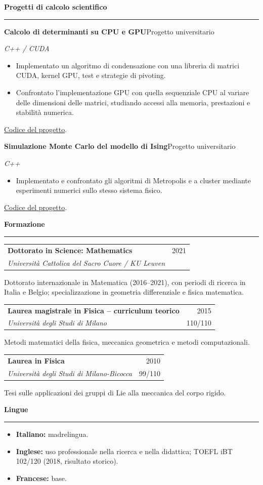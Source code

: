 \documentclass[10pt,a4paper]{article}
\makeatletter
\newcommand{\cvsection}[1]{%
    \Needspace{4\baselineskip}%
    \vspace{0.8em}%
    {\large\bfseries\color{accent} #1}\par
    \vspace{0.2em}\hrule\vspace{0.45em}%
}
\newcommand{\entry}[4]{%
    \Needspace{4\baselineskip}%
    \textbf{#1}\hfill #2\par
    \textit{#3}\par
    #4\par\vspace{0.45em}%
}
\newcommand{\education}[5]{%
    \Needspace{5\baselineskip}%
    \begin{tabularx}{\textwidth}{@{}>{\raggedright\arraybackslash}Xr@{}}
        \textbf{#1} & #2 \\
        \textit{#4} & #3
    \end{tabularx}\par
    #5\par\vspace{0.45em}%
}
\makeatother
\begin{document}
\cvsection{Progetti di calcolo scientifico}
\entry{Calcolo di determinanti su CPU e GPU}{Progetto universitario}{C++ / CUDA}{%
\begin{itemize}
    \item Implementato un algoritmo di condensazione con una libreria di matrici CUDA, kernel GPU, test e strategie di pivoting.
    \item Confrontato l'implementazione GPU con quella sequenziale CPU al variare delle dimensioni delle matrici, studiando accessi alla memoria, prestazioni e stabilità numerica.
\end{itemize}
\href{https://github.com/MasterToninus/Computational-Physics-Exercise/tree/master/Condensation\%20Algorithm\%20in\%20CUDA}{Codice del progetto}.}
\entry{Simulazione Monte Carlo del modello di Ising}{Progetto universitario}{C++}{%
\begin{itemize}
    \item Implementato e confrontato gli algoritmi di Metropolis e a cluster mediante esperimenti numerici sullo stesso sistema fisico.
\end{itemize}
\href{https://github.com/MasterToninus/Computational-Physics-Exercise/tree/master/Ising\%20simulation\%20Metropolis\%20vs\%20Cluster}{Codice del progetto}.}

\cvsection{Formazione}
\education{Dottorato in Science: Mathematics}{2021}{}{Università Cattolica del Sacro Cuore / KU Leuven}{%
Dottorato internazionale in Matematica (2016--2021), con periodi di ricerca in Italia e Belgio; specializzazione in geometria differenziale e fisica matematica.}
\education{Laurea magistrale in Fisica -- curriculum teorico}{2015}{110/110}{Università degli Studi di Milano}{%
Metodi matematici della fisica, meccanica geometrica e metodi computazionali.}
\education{Laurea in Fisica}{2010}{99/110}{Università degli Studi di Milano-Bicocca}{%
Tesi sulle applicazioni dei gruppi di Lie alla meccanica del corpo rigido.}

\cvsection{Lingue}
\begin{itemize}
    \item \textbf{Italiano:} madrelingua.
    \item \textbf{Inglese:} uso professionale nella ricerca e nella didattica; TOEFL iBT 102/120 (2018, risultato storico).
    \item \textbf{Francese:} base.
\end{itemize}
\end{document}
